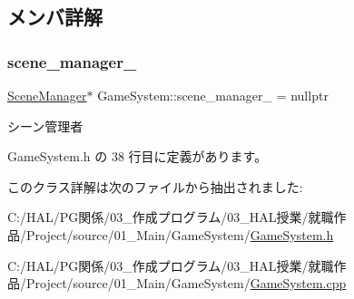\subsection{メンバ詳解}
\mbox{\label{class_game_system_ac398ab7a013177879fd3dd9a9f8d7e48}} 
\subsubsection{\texorpdfstring{scene\+\_\+manager\+\_\+}{scene\_manager\_}}
{\footnotesize\ttfamily \mbox{\hyperlink{class_scene_manager}{Scene\+Manager}}$\ast$ Game\+System\+::scene\+\_\+manager\+\_\+ = nullptr\hspace{0.3cm}{\ttfamily [private]}}



シーン管理者 



 Game\+System.\+h の 38 行目に定義があります。



このクラス詳解は次のファイルから抽出されました\+:\begin{DoxyCompactItemize}
\item 
C\+:/\+H\+A\+L/\+P\+G関係/03\+\_\+作成プログラム/03\+\_\+\+H\+A\+L授業/就職作品/\+Project/source/01\+\_\+\+Main/\+Game\+System/\mbox{\hyperlink{_game_system_8h}{Game\+System.\+h}}\item 
C\+:/\+H\+A\+L/\+P\+G関係/03\+\_\+作成プログラム/03\+\_\+\+H\+A\+L授業/就職作品/\+Project/source/01\+\_\+\+Main/\+Game\+System/\mbox{\hyperlink{_game_system_8cpp}{Game\+System.\+cpp}}\end{DoxyCompactItemize}
